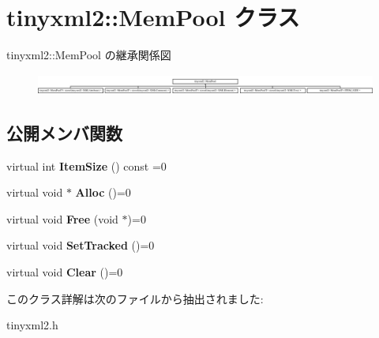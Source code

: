 \hypertarget{classtinyxml2_1_1_mem_pool}{}\section{tinyxml2\+:\+:Mem\+Pool クラス}
\label{classtinyxml2_1_1_mem_pool}
tinyxml2\+:\+:Mem\+Pool の継承関係図\begin{figure}[H]
\begin{center}
\leavevmode
\includegraphics[height=0.691358cm]{classtinyxml2_1_1_mem_pool}
\end{center}
\end{figure}
\subsection*{公開メンバ関数}
\begin{DoxyCompactItemize}
\item 
\mbox{\label{classtinyxml2_1_1_mem_pool_a0c518d49e3a94bde566f61e13b7240bb}} 
virtual int {\bfseries Item\+Size} () const =0
\item 
\mbox{\label{classtinyxml2_1_1_mem_pool_a4f977b5fed752c0bbfe5295f469d6449}} 
virtual void $\ast$ {\bfseries Alloc} ()=0
\item 
\mbox{\label{classtinyxml2_1_1_mem_pool_a49e3bfac2cba2ebd6776b31e571f64f7}} 
virtual void {\bfseries Free} (void $\ast$)=0
\item 
\mbox{\label{classtinyxml2_1_1_mem_pool_ac5804dd1387b2e4de5eef710076a0db1}} 
virtual void {\bfseries Set\+Tracked} ()=0
\item 
\mbox{\label{classtinyxml2_1_1_mem_pool_a74fcdef9756917c8ae19fbbb4d658ed7}} 
virtual void {\bfseries Clear} ()=0
\end{DoxyCompactItemize}


このクラス詳解は次のファイルから抽出されました\+:\begin{DoxyCompactItemize}
\item 
tinyxml2.\+h\end{DoxyCompactItemize}
